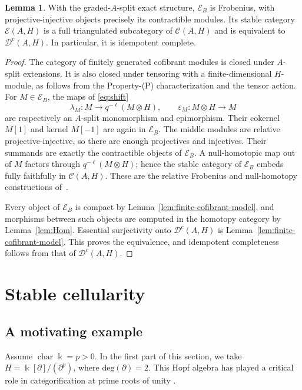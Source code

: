\documentclass[11pt]{article}
\theoremstyle{definition}
\newtheorem{lem}[thm]{Lemma}
\numberwithin{equation}{section}
\newcommand{\kk}{\Bbbk}
\newcommand{\E}{\mathcal E}
\newcommand{\Dc}{\mathcal{D}^c(A,H)}
\newcommand{\Cat}{\mathcal{C}}
\newcommand{\Ecat}{\mathcal{E}_B}
\begin{document}
\begin{lem}\label{lem:frobenius}
With the graded-$A$-split exact structure, $\Ecat$ is Frobenius, with
projective-injective objects precisely its contractible modules.
Its stable category $\E(A,H)$ is a full triangulated subcategory of $\Cat(A,H)$
and is equivalent to $\Dc$.  In particular, it is idempotent complete.
\end{lem}
\begin{proof}
The category of finitely generated cofibrant modules is closed under
$A$-split extensions.  It is also closed under tensoring with a
finite-dimensional $H$-module, as follows from the Property-(P)
characterization and the tensor action.  For $M\in\Ecat$, the maps of \eqref{eq:shift}
\[
\lambda_M: M\longrightarrow q^{-\ell}(M\otimes H),\qquad \varepsilon_M:
 M\otimes H\longrightarrow M
\]
are respectively an $A$-split monomorphism and epimorphism.  Their
cokernel $M[1]$ and kernel $M[-1]$ are again in $\Ecat$.
The middle modules are relative projective-injective, so there are
enough projectives and injectives.  Their summands are exactly the
contractible objects of $\Ecat$.
A null-homotopic map out of $M$ factors through
$q^{-\ell}(M\otimes H)$; hence the stable category of $\Ecat$ embeds fully
faithfully in $\Cat(A,H)$.  These are the relative Frobenius and
null-homotopy constructions of~\cite{QYHopf,QYRickard}.

Every object of $\Ecat$ is compact by
Lemma~\ref{lem:finite-cofibrant-model}, and morphisms between such
objects are computed in the homotopy category by Lemma~\ref{lem:Hom}.
Essential surjectivity onto $\Dc$ is
Lemma~\ref{lem:finite-cofibrant-model}.  This proves the equivalence,
and idempotent completeness follows from that of $\Dc$.
\end{proof}
















\section{Stable cellularity}\label{sec:koszul}
\subsection{A motivating example} \label{subsec:motivating-example}
Assume $\operatorname{char}\kk=p>0$. In the first part of this section, we take
$H=\kk[\partial]/(\partial^p)$, where $\mathrm{deg}(\partial)=2$. This Hopf algebra has played a critical role in categorification at prime roots of unity \cite{KQ}.
\end{document}
